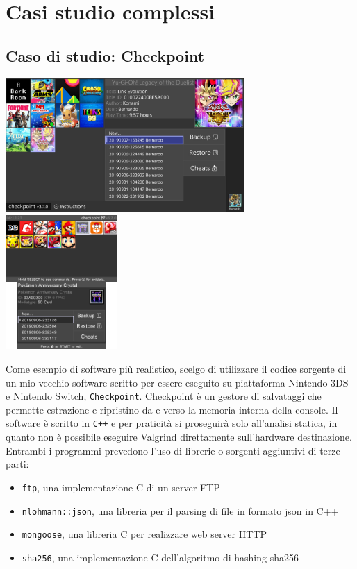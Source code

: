\documentclass{article}
\begin{document}
\newpage
\section{Casi studio complessi}

\subsection{Caso di studio: Checkpoint}
\label{sec:checkpoint}

\includegraphics[width=0.68\textwidth]{images/checkpoint1.jpeg}
\includegraphics[width=0.32\textwidth]{images/checkpoint2.png}

Come esempio di software più realistico, scelgo di utilizzare il codice sorgente
di un mio vecchio software scritto per essere eseguito su piattaforma Nintendo
3DS e Nintendo Switch, \texttt{Checkpoint}. Checkpoint è un gestore di
salvataggi che permette estrazione e ripristino da e verso la memoria interna
della console. Il software è scritto in \texttt{C++} e per praticità si
proseguirà solo all'analisi statica, in quanto non è possibile eseguire Valgrind
direttamente sull'hardware destinazione. \\

Entrambi i programmi prevedono l'uso di librerie o sorgenti aggiuntivi di terze parti:

\begin{itemize}
    \item \texttt{ftp}, una implementazione C di un server FTP
    \item \texttt{nlohmann::json}, una libreria per il parsing di file in
    formato json in C++
    \item \texttt{mongoose}, una libreria C per realizzare web server HTTP
    \item \texttt{sha256}, una implementazione C dell'algoritmo di hashing sha256
\end{itemize}
\end{document}
